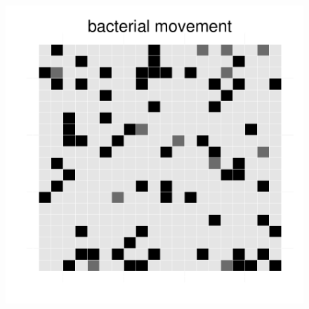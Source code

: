 \begin{figure}[h!]
{\begin{minipage}[t]{0.3\textwidth}
  \end{minipage}
  \begin{minipage}[t]{0.3\textwidth}
    \includegraphics[width=\textwidth]{../results/barkeri_ecoli_20x20_seed4612_bac150.pdf}
  \end{minipage}
  }
\end{figure}
